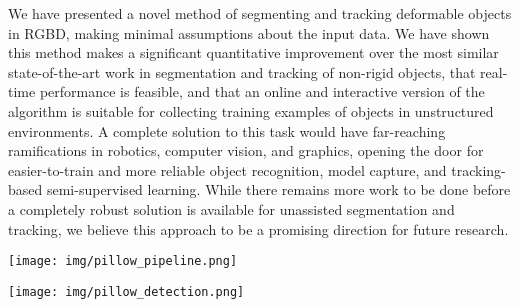 \documentclass[journal]{IEEEtran}
\begin{document}
We have presented a novel method of segmenting and tracking deformable objects in RGBD, making minimal assumptions about the input data.  We have shown this method makes a significant quantitative improvement over the most similar state-of-the-art work in segmentation and tracking of non-rigid objects, that real-time performance is feasible, and that an online and interactive version of the algorithm is suitable for collecting training examples of objects in unstructured environments.  A complete solution to this task would have far-reaching ramifications in robotics, computer vision, and graphics, opening the door for easier-to-train and more reliable object recognition, model capture, and tracking-based semi-supervised learning.  While there remains more work to be done before a completely robust solution is available for unassisted segmentation and tracking, we believe this approach to be a promising direction for future research.

\begin{figure*}
\centering
        \texttt{[image: img/pillow\_pipeline.png]}
\caption{\small{Example data labeling pipeline demonstrating one possible application of the STRGEN algorithm.  Segmented objects are obtained while the raw data is being recorded.  Segmentation hints from the user generate node potentials in the CRF so the user can direct the segmentation at any time; without input, the segmenter makes use of only the other cues discussed in Section~\ref{sec:energy} to produce segmentation masks. The output is a set of segmented object examples suitable for training standard object detectors. }}
\label{fig:data_labeling}
\end{figure*}

\begin{figure*}
\centering
        \texttt{[image: img/pillow\_detection.png]}
\caption{\small{Object detection example trained using the method in Figure~\ref{fig:data_labeling}. Color and depth templates are extracted from segmented training objects; an appropriate object detection method (LINE-MOD in our example) searches for the templates in previously-unseen test frames and identifies ``detections'' as matches with responses exceeding a threshold.}}
\label{fig:object_rec}
\end{figure*}




\end{document}
